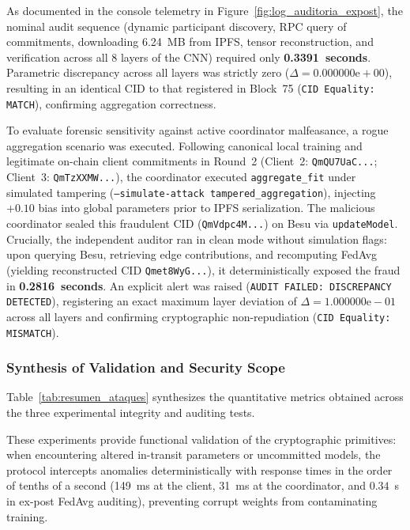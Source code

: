 As documented in the console telemetry in Figure~\ref{fig:log_auditoria_expost}, the nominal audit sequence (dynamic participant discovery, RPC query of commitments, downloading 6.24~MB from IPFS, tensor reconstruction, and verification across all 8 layers of the CNN) required only \textbf{0.3391~seconds}. Parametric discrepancy across all layers was strictly zero ($\Delta = 0.000000\text{e}+00$), resulting in an identical CID to that registered in Block~75 (\texttt{CID Equality: MATCH}), confirming aggregation correctness.

To evaluate forensic sensitivity against active coordinator malfeasance, a rogue aggregation scenario was executed. Following canonical local training and legitimate on-chain client commitments in Round~2 (Client~2: \texttt{QmQU7UaC...}; Client~3: \texttt{QmTzXXMW...}), the coordinator executed \texttt{aggregate\_fit} under simulated tampering (\texttt{--simulate-attack tampered\_aggregation}), injecting $+0.10$ bias into global parameters prior to IPFS serialization. The malicious coordinator sealed this fraudulent CID (\texttt{QmVdpc4M...}) on Besu via \texttt{updateModel}. Crucially, the independent auditor ran in clean mode without simulation flags: upon querying Besu, retrieving edge contributions, and recomputing FedAvg (yielding reconstructed CID \texttt{Qmet8WyG...}), it deterministically exposed the fraud in \textbf{0.2816~seconds}. An explicit alert was raised (\texttt{AUDIT FAILED: DISCREPANCY DETECTED}), registering an exact maximum layer deviation of $\Delta = 1.000000\text{e}-01$ across all layers and confirming cryptographic non-repudiation (\texttt{CID Equality: MISMATCH}).

\subsubsection{Synthesis of Validation and Security Scope}
Table~\ref{tab:resumen_ataques} synthesizes the quantitative metrics obtained across the three experimental integrity and auditing tests.

These experiments provide functional validation of the cryptographic primitives: when encountering altered in-transit parameters or uncommitted models, the protocol intercepts anomalies deterministically with response times in the order of tenths of a second (149~ms at the client, 31~ms at the coordinator, and $0.34$~s in ex-post FedAvg auditing), preventing corrupt weights from contaminating training.

